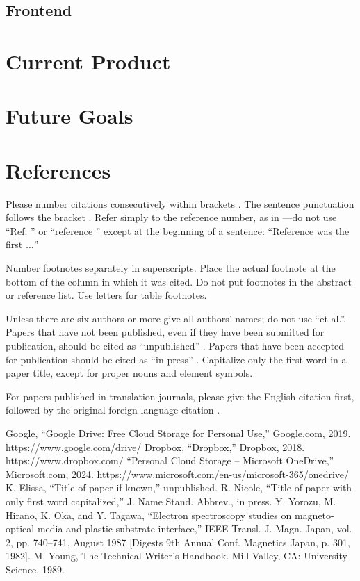 \documentclass[conference]{IEEEtran}
\begin{document}
\subsection{Frontend}

\section{Current Product}

\section{Future Goals}


\section*{References}

Please number citations consecutively within brackets \cite{b1}. The 
sentence punctuation follows the bracket \cite{b2}. Refer simply to the reference 
number, as in \cite{b3}---do not use ``Ref. \cite{b3}'' or ``reference \cite{b3}'' except at 
the beginning of a sentence: ``Reference \cite{b3} was the first $\ldots$''

Number footnotes separately in superscripts. Place the actual footnote at 
the bottom of the column in which it was cited. Do not put footnotes in the 
abstract or reference list. Use letters for table footnotes.

Unless there are six authors or more give all authors' names; do not use 
``et al.''. Papers that have not been published, even if they have been 
submitted for publication, should be cited as ``unpublished'' \cite{b4}. Papers 
that have been accepted for publication should be cited as ``in press'' \cite{b5}. 
Capitalize only the first word in a paper title, except for proper nouns and 
element symbols.

For papers published in translation journals, please give the English 
citation first, followed by the original foreign-language citation \cite{b6}.

\begin{thebibliography}{00}
 Google, “Google Drive: Free Cloud Storage for Personal Use,” Google.com, 2019. https://www.google.com/drive/
 Dropbox, “Dropbox,” Dropbox, 2018. https://www.dropbox.com/
 “Personal Cloud Storage – Microsoft OneDrive,” Microsoft.com, 2024. https://www.microsoft.com/en-us/microsoft-365/onedrive/
 K. Elissa, ``Title of paper if known,'' unpublished.
 R. Nicole, ``Title of paper with only first word capitalized,'' J. Name Stand. Abbrev., in press.
 Y. Yorozu, M. Hirano, K. Oka, and Y. Tagawa, ``Electron spectroscopy studies on magneto-optical media and plastic substrate interface,'' IEEE Transl. J. Magn. Japan, vol. 2, pp. 740--741, August 1987 [Digests 9th Annual Conf. Magnetics Japan, p. 301, 1982].
 M. Young, The Technical Writer's Handbook. Mill Valley, CA: University Science, 1989.
\end{thebibliography}
\vspace{12pt}
\end{document}
